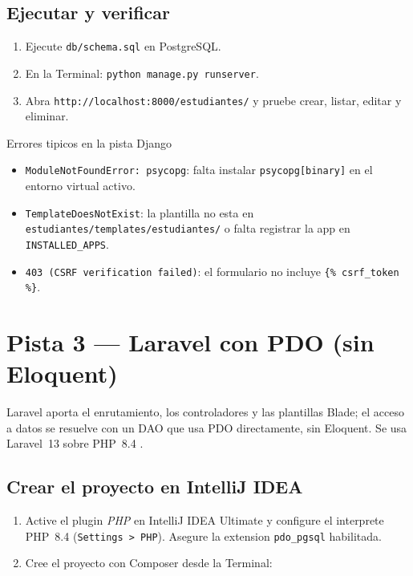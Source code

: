 \documentclass[11pt,a4paper,openany]{book}
\begin{document}
\subsection{Ejecutar y verificar}
\label{ap:crud:django:run}

\begin{enumerate}
\item Ejecute \texttt{db/schema.sql} en PostgreSQL.
\item En la Terminal: \texttt{python manage.py runserver}.
\item Abra \texttt{http://localhost:8000/estudiantes/} y pruebe crear,
listar, editar y eliminar.
\end{enumerate}

\begin{cajaadvertencia}{Errores tipicos en la pista Django}
\begin{itemize}
\item \texttt{ModuleNotFoundError: psycopg}: falta instalar
\texttt{psycopg[binary]} en el entorno virtual activo.
\item \texttt{TemplateDoesNotExist}: la plantilla no esta en
\texttt{estudiantes/templates/estudiantes/} o falta registrar la app en
\texttt{INSTALLED\_APPS}.
\item \texttt{403 (CSRF verification failed)}: el formulario no incluye
\texttt{\{\% csrf\_token \%\}}.
\end{itemize}
\end{cajaadvertencia}

\section{Pista 3 --- Laravel con PDO (sin Eloquent)}
\label{ap:crud:laravel}

Laravel aporta el enrutamiento, los controladores y las plantillas
Blade; el acceso a datos se resuelve con un DAO que usa PDO
directamente, sin Eloquent. Se usa Laravel~13 sobre PHP~8.4
\cite{laravel13docs,phppdo}.

\subsection{Crear el proyecto en IntelliJ IDEA}
\label{ap:crud:laravel:crear}

\begin{enumerate}
\item Active el plugin \emph{PHP} en IntelliJ IDEA Ultimate y configure
el interprete PHP~8.4 (\texttt{Settings > PHP}). Asegure la extension
\texttt{pdo\_pgsql} habilitada.
\item Cree el proyecto con Composer desde la Terminal:
\end{enumerate}
\end{document}
